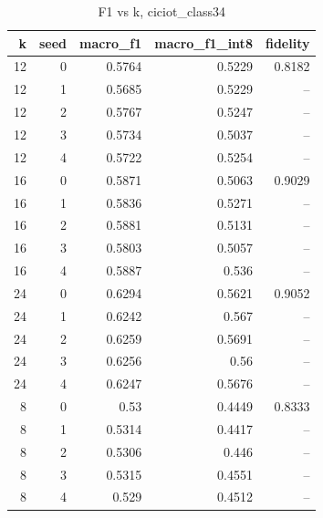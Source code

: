 \begin{table}
\caption{F1 vs k, ciciot_class34}
\begin{tabular}{rrrrr}
\toprule
k & seed & macro_f1 & macro_f1_int8 & fidelity \\
\midrule
12 & 0 & 0.5764 & 0.5229 & 0.8182 \\
12 & 1 & 0.5685 & 0.5229 & -- \\
12 & 2 & 0.5767 & 0.5247 & -- \\
12 & 3 & 0.5734 & 0.5037 & -- \\
12 & 4 & 0.5722 & 0.5254 & -- \\
16 & 0 & 0.5871 & 0.5063 & 0.9029 \\
16 & 1 & 0.5836 & 0.5271 & -- \\
16 & 2 & 0.5881 & 0.5131 & -- \\
16 & 3 & 0.5803 & 0.5057 & -- \\
16 & 4 & 0.5887 & 0.536 & -- \\
24 & 0 & 0.6294 & 0.5621 & 0.9052 \\
24 & 1 & 0.6242 & 0.567 & -- \\
24 & 2 & 0.6259 & 0.5691 & -- \\
24 & 3 & 0.6256 & 0.56 & -- \\
24 & 4 & 0.6247 & 0.5676 & -- \\
8 & 0 & 0.53 & 0.4449 & 0.8333 \\
8 & 1 & 0.5314 & 0.4417 & -- \\
8 & 2 & 0.5306 & 0.446 & -- \\
8 & 3 & 0.5315 & 0.4551 & -- \\
8 & 4 & 0.529 & 0.4512 & -- \\
\bottomrule
\end{tabular}
\end{table}
